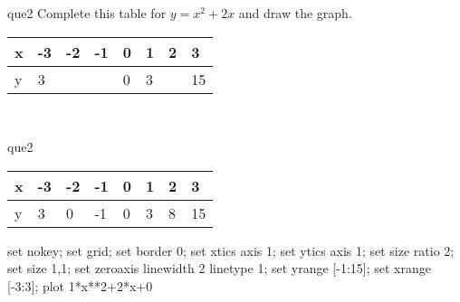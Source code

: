 \documentclass[13.5pt, varwidth=true]{beamer}
\begin{document}
\begin{frame}[shrink=19,fragile]
	\begin{beamercolorbox}[rounded=true, left, shadow=true,wd=14.8cm]{que2}
		 Complete this table for $y = x^{2} + 2x$ and draw the graph. \\[0.3cm] \renewcommand{\arraystretch}{1.2}\begin{tabular}{|C|C|C|C|C|C|C|C|} \hline x & -3 & -2 & -1 & 0 & 1 & 2 & 3 \\ \hline y & 3 &  &  & 0 & 3 &  & 15\\ \hline \end{tabular}\\[0.3cm]
	\end{beamercolorbox}
\end{frame}
\begin{frame}[shrink=19,fragile]
	\begin{beamercolorbox}[rounded=true, left, shadow=true,wd=14.8cm]{que2}
		\renewcommand{\arraystretch}{1.2}\begin{tabular}{|C|C|C|C|C|C|C|C|} \hline x & -3 & -2 & -1 & 0 & 1 & 2 & 3 \\ \hline y & 3 & 0 & -1 & 0 & 3 & 8 & 15\\ \hline \end{tabular}\begin{gnuplot}[terminal=pdf] set nokey; set grid; set border 0; set xtics axis 1; set ytics axis 1; set size ratio 2; set size 1,1; set zeroaxis linewidth 2 linetype 1; set yrange [-1:15]; set xrange [-3:3]; plot 1*x**2+2*x+0 \end{gnuplot}
	\end{beamercolorbox}
\end{frame}
\end{document}
